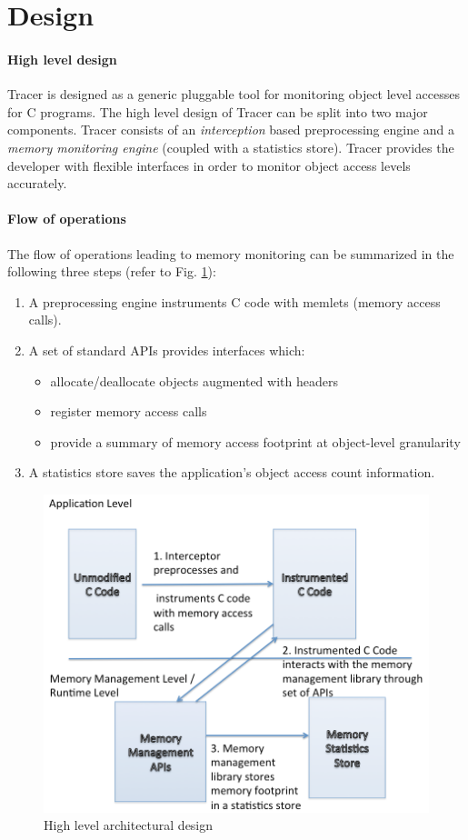 \section{Design}
\label{sec:design}
\paragraph{High level design}
Tracer is designed as a generic pluggable tool for monitoring object level accesses for C programs. The high level design of Tracer can be split into two major components. Tracer consists of an {\emph{interception}} based preprocessing engine and a {\emph{memory monitoring engine}} (coupled with a statistics store). Tracer provides the developer with flexible interfaces in order to monitor object access levels accurately. 

\paragraph{Flow of operations}
The flow of operations leading to memory monitoring can be summarized in the following three steps (refer to Fig. \ref{fig:architecture}):
\begin{enumerate}
\item A preprocessing engine instruments C code with memlets (memory access calls).
\item A set of standard APIs provides interfaces which:
\begin{itemize}
\item allocate/deallocate objects augmented with headers
\item register memory access calls
\item provide a summary of memory access footprint at object-level granularity
\end{itemize}
\item A statistics store saves the application's object access count information.
\end{enumerate}

\begin{figure}[!ht]
\caption{High level architectural design}
\label{fig:architecture}
\includegraphics[scale=0.3]{./images/architecture.png}
\end{figure}

